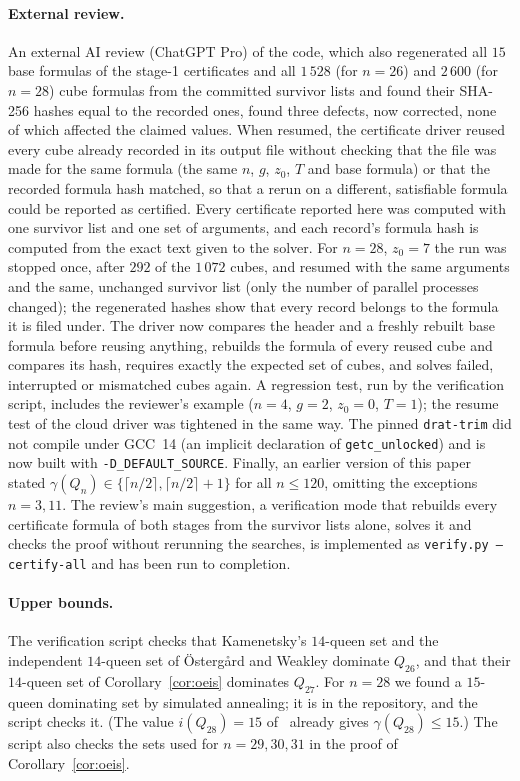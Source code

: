 \documentclass[11pt]{article}
\theoremstyle{definition}
\theoremstyle{remark}
\begin{document}
\paragraph{External review.} An external AI review (ChatGPT Pro) of the code, which also regenerated all
$15$ base formulas of the stage-1 certificates and all $1\,528$ (for $n=26$) and $2\,600$ (for $n=28$) cube
formulas from the committed survivor lists and found their SHA-256 hashes equal to the recorded ones,
found three defects, now corrected, none of which affected the claimed values. When resumed, the
certificate driver reused every cube already recorded in its output file without checking that the file
was made for the same formula (the same $n$, $g$, $z_0$, $T$ and base formula) or that the recorded
formula hash matched, so that a rerun on a different, satisfiable formula could be reported as
certified. Every certificate reported here was computed with one survivor list and one set of
arguments, and each record's formula hash is computed from the exact text given to the solver. For
$n=28$, $z_0=7$ the run was stopped once, after $292$ of the $1\,072$ cubes, and resumed with the same
arguments and the same, unchanged survivor list (only the number of parallel processes changed); the
regenerated hashes show that every record belongs to the formula it is filed under. The driver now
compares the header and a freshly rebuilt base formula before reusing anything, rebuilds the formula of
every reused cube and compares its hash, requires exactly the expected set of cubes, and solves failed,
interrupted or mismatched cubes again. A regression test, run by the verification script, includes the
reviewer's example ($n=4$, $g=2$, $z_0=0$, $T=1$); the resume test of the cloud driver was tightened in the
same way. The pinned \texttt{drat-trim} did not compile under GCC~14 (an implicit declaration of
\texttt{getc\_unlocked}) and is now built with \texttt{-D\_DEFAULT\_SOURCE}. Finally, an earlier version of
this paper stated $\gamma(Q_n)\in\{\lceil n/2\rceil,\lceil n/2\rceil+1\}$ for all $n\le120$, omitting the
exceptions $n=3,11$. The review's main suggestion, a verification mode that rebuilds every certificate
formula of both stages from the survivor lists alone, solves it and checks the proof without rerunning
the searches, is implemented as \texttt{verify.py --certify-all} and has been run to completion.

\paragraph{Upper bounds.} The verification script checks that Kamenetsky's $14$-queen set and the
independent $14$-queen set of \"Osterg\aa rd and Weakley dominate $Q_{26}$, and that their $14$-queen
set of Corollary~\ref{cor:oeis} dominates $Q_{27}$. For $n=28$ we found a $15$-queen dominating set by
simulated annealing; it is in the repository, and the script checks it. (The value $i(Q_{28})=15$
of~\cite{LMR} already gives $\gamma(Q_{28})\le15$.) The script also checks the sets used for $n=29,30,31$
in the proof of Corollary~\ref{cor:oeis}.
\end{document}
